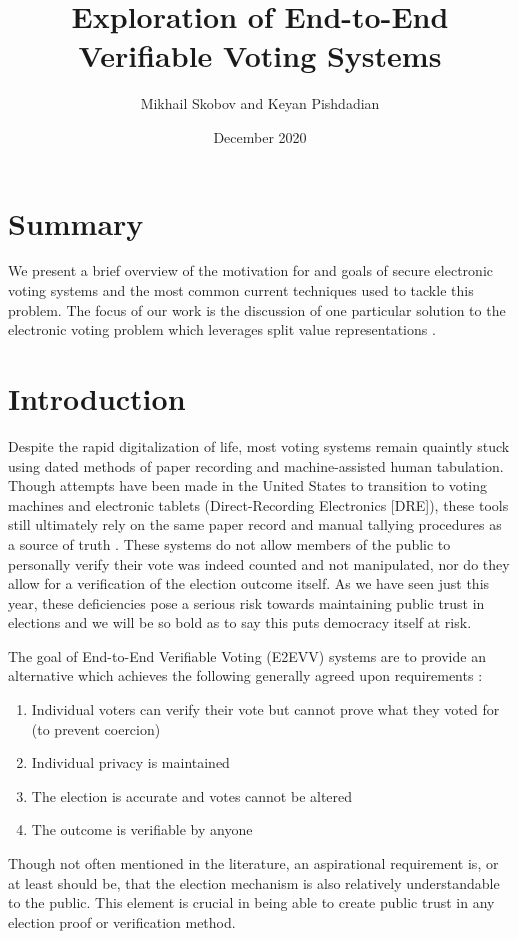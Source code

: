 \documentclass{article}
\title{Exploration of End-to-End Verifiable Voting Systems}
\author{Mikhail Skobov and Keyan Pishdadian}
\date{December 2020}
\begin{document}
\maketitle

\section*{Summary}
We present a brief overview of the motivation for and goals of secure electronic voting systems and the most common current techniques used to tackle this problem. The focus of our work is the discussion of one particular solution to the electronic voting problem which leverages split value representations \cite{svr_vote}.

\section{Introduction}
Despite the rapid digitalization of life, most voting systems remain quaintly stuck using dated methods of paper recording and machine-assisted human tabulation. Though attempts have been made in the United States to transition to voting machines and electronic tablets (Direct-Recording Electronics [DRE]), these tools still ultimately rely on the same paper record and manual tallying procedures as a source of truth \cite{ncsl}. These systems do not allow members of the public to personally verify their vote was indeed counted and not manipulated, nor do they allow for a verification of the election outcome itself. As we have seen just this year, these deficiencies pose a serious risk towards maintaining public trust in elections and we will be so bold as to say this puts democracy itself at risk.

The goal of End-to-End Verifiable Voting (E2EVV) systems are to provide an alternative which achieves the following generally agreed upon requirements \cite{mit}:
\begin{enumerate}
\item
    Individual voters can verify their vote but cannot prove what they voted for (to prevent coercion)
\item
    Individual privacy is maintained
\item
    The election is accurate and votes cannot be altered
\item
    The outcome is verifiable by anyone
\end{enumerate}

Though not often mentioned in the literature, an aspirational requirement is, or at least should be, that the election mechanism is also relatively understandable to the public. This element is crucial in being able to create public trust in any election proof or verification method.
\end{document}
